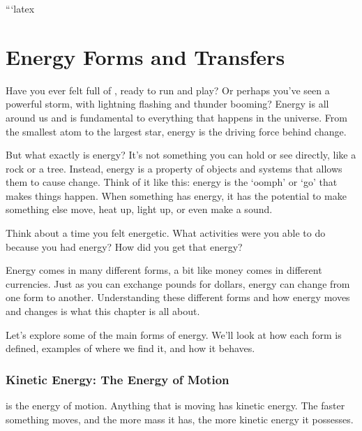 ```latex
\chapter{Energy Forms and Transfers}

\FloatBarrier
\1

Have you ever felt full of , ready to run and play? Or perhaps you’ve seen a powerful storm, with lightning flashing and thunder booming? Energy is all around us and is fundamental to everything that happens in the universe.  From the smallest atom to the largest star, energy is the driving force behind change.


But what exactly is energy?  It's not something you can hold or see directly, like a rock or a tree. Instead, energy is a property of objects and systems that allows them to cause change.  Think of it like this: energy is the ‘oomph’ or ‘go’ that makes things happen.  When something has energy, it has the potential to make something else move, heat up, light up, or even make a sound.

\begin{stopandthink}
Think about a time you felt energetic. What activities were you able to do because you had energy? How did you get that energy?
\end{stopandthink}

Energy comes in many different forms, a bit like money comes in different currencies.  Just as you can exchange pounds for dollars, energy can change from one form to another.  Understanding these different forms and how energy moves and changes is what this chapter is all about.

\FloatBarrier
\1

Let's explore some of the main forms of energy. We'll look at how each form is defined, examples of where we find it, and how it behaves.

\subsection{Kinetic Energy: The Energy of Motion}

 is the energy of motion.  Anything that is moving has kinetic energy. The faster something moves, and the more mass it has, the more kinetic energy it possesses.

